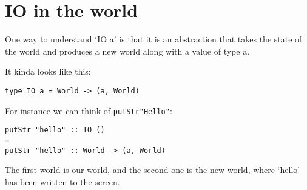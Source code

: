 \documentclass[11pt,a4paper,titlepage,dvipsnames,cmyk]{scrartcl}
\begin{document}
\section{IO in the world}%
\label{sec:world}
One way to understand `IO a' is that it is an abstraction that takes the
state of the world and produces a new world along with a value of type a.

It kinda looks like this:
\begin{lstlisting}[style=B]
type IO a = World -> (a, World)
\end{lstlisting}

For instance we can think of \lstinline|putStr"Hello"|:
\begin{lstlisting}[style=B]
putStr "hello" :: IO ()
=
putStr "hello" :: World -> (a, World)
\end{lstlisting}

The first world is our world, and the second one is the new world, where
`hello' has been written to the screen.
\end{document}
